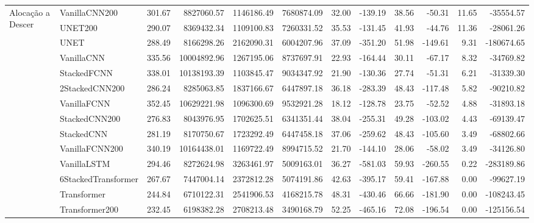 \begin{tabular}{llrrrrrrrrrr}
\cline{1-12}
\multirow[t]{14}{*}{Alocação a Descer} & VanillaCNN200 & 301.67 & 8827060.57 & 1146186.49 & 7680874.09 & 32.00 & -139.19 & 38.56 & -50.31 & 11.65 & -35554.57 \\
 & UNET200 & 290.07 & 8369432.34 & 1109100.83 & 7260331.52 & 35.53 & -131.45 & 41.93 & -44.76 & 11.36 & -28061.26 \\
 & UNET & 288.49 & 8166298.26 & 2162090.31 & 6004207.96 & 37.09 & -351.20 & 51.98 & -149.61 & 9.31 & -180674.65 \\
 & VanillaCNN & 335.56 & 10004892.96 & 1267195.06 & 8737697.91 & 22.93 & -164.44 & 30.11 & -67.17 & 8.32 & -34769.82 \\
 & StackedFCNN & 338.01 & 10138193.39 & 1103845.47 & 9034347.92 & 21.90 & -130.36 & 27.74 & -51.31 & 6.21 & -31339.30 \\
 & 2StackedCNN200 & 286.24 & 8285063.85 & 1837166.67 & 6447897.18 & 36.18 & -283.39 & 48.43 & -117.48 & 5.82 & -90210.82 \\
 & VanillaFCNN & 352.45 & 10629221.98 & 1096300.69 & 9532921.28 & 18.12 & -128.78 & 23.75 & -52.52 & 4.88 & -31893.18 \\
 & StackedCNN200 & 276.83 & 8043976.95 & 1702625.51 & 6341351.44 & 38.04 & -255.31 & 49.28 & -103.02 & 4.43 & -69139.47 \\
 & StackedCNN & 281.19 & 8170750.67 & 1723292.49 & 6447458.18 & 37.06 & -259.62 & 48.43 & -105.60 & 3.49 & -68802.66 \\
 & VanillaFCNN200 & 340.19 & 10164438.01 & 1169722.49 & 8994715.52 & 21.70 & -144.10 & 28.06 & -58.02 & 3.49 & -34126.80 \\
 & VanillaLSTM & 294.46 & 8272624.98 & 3263461.97 & 5009163.01 & 36.27 & -581.03 & 59.93 & -260.55 & 0.22 & -283189.86 \\
 & 6StackedTransformer & 267.67 & 7447004.14 & 2372812.28 & 5074191.86 & 42.63 & -395.17 & 59.41 & -167.88 & 0.00 & -99627.19 \\
 & Transformer & 244.84 & 6710122.31 & 2541906.53 & 4168215.78 & 48.31 & -430.46 & 66.66 & -181.90 & 0.00 & -108243.45 \\
 & Transformer200 & 232.45 & 6198382.28 & 2708213.48 & 3490168.79 & 52.25 & -465.16 & 72.08 & -196.54 & 0.00 & -125156.54 \\
\cline{1-12}
\bottomrule
\end{tabular}
